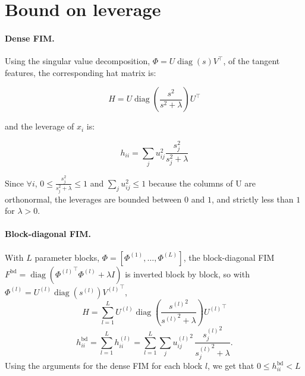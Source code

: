 \documentclass[11pt]{article}
\DeclareMathOperator{\diag}{diag}
\begin{document}
\section{Bound on leverage}

\paragraph{Dense FIM.} Using the singular value decomposition, $\Phi=U \diag(s) V^\top$, of the tangent features, the corresponding hat matrix is:

$$H=U\diag\left(\frac{s^2}{s^2+\lambda}\right)U^\top$$

and the leverage of $x_i$ is:

$$h_{ii}=\sum_j u_{ij}^2\frac{s_j^2}{s_j^2 + \lambda}$$

Since $\forall i$, $0\leq\frac {s_j^2}{s_j^2 + \lambda}\leq1$ and $\sum_j u_{ij}^2\leq1$ because the columns of U are orthonormal, the leverages are bounded between $0$ and $1$, and strictly less than $1$ for $\lambda>0$.

\paragraph{Block-diagonal FIM.}
With $L$ parameter blocks, $\Phi=[\Phi^{(1)},\dots,\Phi^{(L)}]$, the block-diagonal FIM
$F^{\mathrm{bd}}=\diag({\Phi^{(l)}}^\top\Phi^{(l)}+\lambda I)$ is
inverted block by block, so with $\Phi^{(l)}=U^{(l)}\diag(s^{(l)}){V^{(l)}}^\top$,
\begin{equation*}
	H = \sum_{l=1}^{L}U^{(l)}\diag\left(\frac{{s^{(l)}}^2}{{s^{(l)}}^2 + \lambda}\right){U^{(l)}}^{\top}
\end{equation*}
\begin{equation*}
  h^{\mathrm{bd}}_{ii}=\sum_{l=1}^L h^{(l)}_{ii}
  =\sum_{l=1}^L\sum_j {u^{(l)}_{ij}}^2\,\frac{{s^{(l)}_j}^2}{{s^{(l)}_j}^2+\lambda}.
\end{equation*}
Using the arguments for the dense FIM for each block $l$, we get that $0\leq h_{ii}^{\text{bd}}<L$
\end{document}
